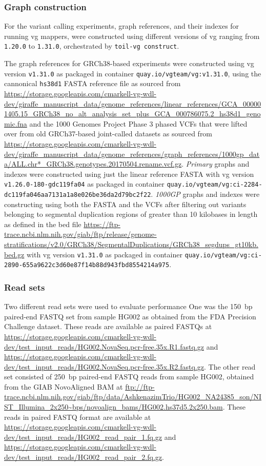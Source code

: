 \documentclass[11pt]{ucscthesis}
\newcommand{\vocab}[1]{\emph{#1}}
\begin{document}
\subsubsection{Graph construction} \label{subsec:aim2:graph_construction}
For the variant calling experiments, graph references, and their indexes for running vg mappers, were constructed using different versions of vg ranging from \texttt{1.20.0} to \texttt{1.31.0}, orchestrated by \texttt{toil-vg~construct}.

The graph references for GRCh38-based experiments were constructed using vg version \texttt{v1.31.0} as packaged in container \texttt{quay.io/vgteam/vg:v1.31.0}, using the cannonical \texttt{hs38d1} FASTA reference file as sourced from \url{https://storage.googleapis.com/cmarkell-vg-wdl-dev/giraffe_manuscript_data/genome_references/linear_references/GCA_000001405.15_GRCh38_no_alt_analysis_set_plus_GCA_000786075.2_hs38d1_genomic.fna} and the 1000 Genomes Project Phase 3 phased VCFs that were lifted over from old GRCh37-based joint-called datasets as sourced from \url{https://storage.googleapis.com/cmarkell-vg-wdl-dev/giraffe_manuscript_data/genome_references/graph_references/1000gp_data/ALL.chr*_GRCh38.genotypes.20170504.rename.vcf.gz}.
\vocab{Primary} graphs and indexes were constructed using just the linear reference FASTA with vg version \texttt{v1.26.0-180-gdc119fa04} as packaged in container \texttt{quay.io/vgteam/vg:ci-2284-dc119fa046aa7131a1a8e026be36da2d79bc2f22}.
\vocab{1000GP} graphs and indexes were constructing using both the FASTA and the VCFs after filtering out variants belonging to segmental duplication regions of greater than 10 kilobases in length as defined in the bed file \url{https://ftp-trace.ncbi.nlm.nih.gov/giab/ftp/release/genome-stratifications/v2.0/GRCh38/SegmentalDuplications/GRCh38_segdups_gt10kb.bed.gz} with vg version \texttt{v1.31.0} as packaged in container \texttt{quay.io/vgteam/vg:ci-2890-655a9622c3d60e87f14b88d943fbd8554214a975}.


\subsubsection{Read sets}
Two different read sets were used to evaluate performance
One was the 150~bp paired-end FASTQ set from sample HG002 as obtained from the FDA Precision Challenge dataset.
These reads are available as paired FASTQs at \url{https://storage.googleapis.com/cmarkell-vg-wdl-dev/test_input_reads/HG002.NovaSeq.pcr-free.35x.R1.fastq.gz} and \url{https://storage.googleapis.com/cmarkell-vg-wdl-dev/test_input_reads/HG002.NovaSeq.pcr-free.35x.R2.fastq.gz}.
The other read set consisted of 250~bp paired-end FASTQ reads from sample HG002, obtained from the GIAB NovoAligned BAM at \url{ftp://ftp-trace.ncbi.nlm.nih.gov/giab/ftp/data/AshkenazimTrio/HG002_NA24385_son/NIST_Illumina_2x250~bps/novoalign_bams/HG002.hs37d5.2x250.bam}.
These reads in paired FASTQ format are available at \url{https://storage.googleapis.com/cmarkell-vg-wdl-dev/test_input_reads/HG002_read_pair_1.fq.gz} and \url{https://storage.googleapis.com/cmarkell-vg-wdl-dev/test_input_reads/HG002_read_pair_2.fq.gz}.
\end{document}
